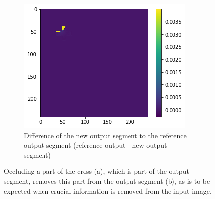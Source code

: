 \begin{figure}[H]
    \begin{subfigure}[t]{.33\textwidth}
        \centering
        \includegraphics[width=\linewidth]{chapters/06_hdm/images_analyze/3c_diff.png}
        \caption{Difference of the new output segment to the reference output segment (reference output - new output segment)}
    \end{subfigure}
    \caption{Occluding a part of the cross (a), which is part of the output segment, removes this part from the output segment (b), as is to be expected when crucial information is removed from the input image.}
    \label{hdm_changed_output_3}
\end{figure}



